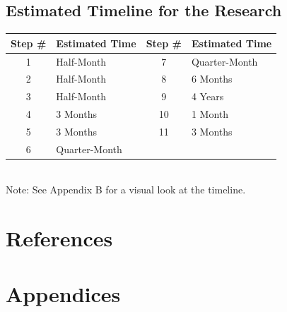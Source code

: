 \documentclass[titlepage]{article}
\begin{document}
\subsection{Estimated Timeline for the Research}

\begin{center}
\begin{tabular}{|c|l|c|l|}
\hline
Step \# & Estimated Time & Step \# & Estimated Time \\
\hline
1 & Half-Month & 7 & Quarter-Month \\
\hline
2 & Half-Month & 8 & 6 Months \\
\hline
3 & Half-Month & 9 & 4 Years \\
\hline
4 & 3 Months & 10 & 1 Month \\
\hline
5 & 3 Months & 11 & 3 Months \\
\hline
6 & Quarter-Month &  &  \\
\hline
\end{tabular}
\\
Note: See Appendix B for a visual look at the timeline.

\end{center}


\clearpage

\section{References}



{}

\clearpage

\section{Appendices}
\end{document}
